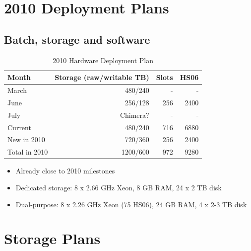 \documentclass{beamer}
\begin{document}
\section{2010 Deployment Plans}
\subsection{Batch, storage and software}
\begin{frame}
\begin{table}
\begin{tabular}{lrrr}
	\toprule
	Month					 	&	Storage (raw/writable TB)	&	Slots		& HS06 \\
	\midrule
	March					 	&	480/240										& - 			& - \\
	June						&	256/128										& 256			& 2400 \\
	July						&	Chimera?									&	-				&	- \\
	\midrule
	Current					& 480/240										& 716			& 6880 \\
	New in 2010			&	720/360										& 256 		& 2400 \\
	Total in 2010		&	1200/600									& 972 		& 9280 \\
	\bottomrule
\end{tabular}
\caption{2010 Hardware Deployment Plan}
\label{2010_hardware deployment_plan}
\end{table}

\begin{itemize}
	\item Already close to 2010 milestones
	\item Dedicated storage: 8 x 2.66 GHz Xeon, 8 GB RAM, 24 x 2 TB disk
	\item Dual-purpose: 8 x 2.26 GHz Xeon (75 HS06), 24 GB RAM, 4 x 2-3 TB disk
\end{itemize}

\end{frame}

\section{Storage Plans}
\end{document}

